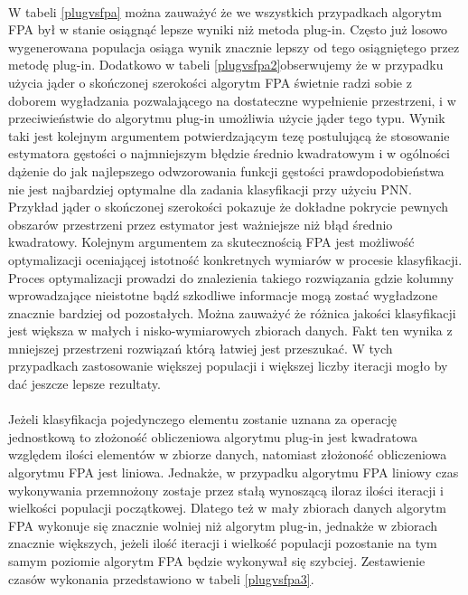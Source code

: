 \documentclass[a4paper,12pt,twoside]{article}
\begin{document}
\paragraph{}
W tabeli \ref{plugvsfpa} można zauważyć że we wszystkich przypadkach algorytm FPA był w stanie osiągnąć lepsze wyniki niż metoda plug-in. Często już losowo wygenerowana populacja osiąga wynik znacznie lepszy od tego osiągniętego przez metodę plug-in. Dodatkowo w tabeli \ref{plugvsfpa2}obserwujemy że w przypadku użycia jąder o skończonej szerokości algorytm FPA świetnie radzi sobie z doborem wygładzania pozwalającego na dostateczne wypełnienie przestrzeni, i w przeciwieństwie do algorytmu plug-in umożliwia użycie jąder tego typu. Wynik taki jest kolejnym argumentem potwierdzającym tezę postulującą że stosowanie estymatora gęstości o najmniejszym błędzie średnio kwadratowym i w ogólności dążenie do jak najlepszego odwzorowania funkcji gęstości prawdopodobieństwa nie jest najbardziej optymalne dla zadania klasyfikacji przy użyciu PNN. Przykład jąder o skończonej szerokości pokazuje że dokładne pokrycie pewnych obszarów przestrzeni przez estymator jest ważniejsze niż błąd średnio kwadratowy. Kolejnym argumentem za skutecznością FPA jest możliwość optymalizacji oceniającej istotność konkretnych wymiarów w procesie klasyfikacji. Proces optymalizacji prowadzi do znalezienia takiego rozwiązania gdzie kolumny wprowadzające nieistotne bądź szkodliwe informacje mogą zostać wygładzone znacznie bardziej od pozostałych. Można zauważyć że różnica jakości klasyfikacji jest większa w małych i nisko-wymiarowych zbiorach danych. Fakt ten wynika z mniejszej przestrzeni rozwiązań którą łatwiej jest przeszukać. W tych przypadkach zastosowanie większej populacji i większej liczby iteracji mogło by dać jeszcze lepsze rezultaty.
\paragraph{}
Jeżeli klasyfikacja pojedynczego elementu zostanie uznana za operację jednostkową to złożoność obliczeniowa algorytmu plug-in jest kwadratowa względem ilości elementów w zbiorze danych, natomiast złożoność obliczeniowa algorytmu FPA jest liniowa. Jednakże, w przypadku algorytmu FPA liniowy czas wykonywania przemnożony zostaje przez stałą wynoszącą iloraz ilości iteracji i wielkości populacji początkowej. Dlatego też w mały zbiorach danych algorytm FPA wykonuje się znacznie wolniej niż algorytm plug-in, jednakże w zbiorach znacznie większych, jeżeli ilość iteracji i wielkość populacji pozostanie na tym samym poziomie algorytm FPA będzie wykonywał się szybciej. Zestawienie czasów wykonania przedstawiono w tabeli \ref{plugvsfpa3}.
\end{document}
